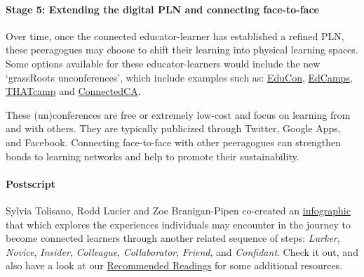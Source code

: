 \paragraph{Stage 5: Extending the digital PLN and connecting
face-to-face}

Over time, once the connected educator-learner has established a refined
PLN, these peeragogues may choose to shift their learning into physical
learning spaces. Some options available for these educator-learners
would include the new `grassRoots unconferences', which include examples
such as: \href{http://educonphilly.org/}{EduCon},
\href{http://davidwees.com/content/what-edcamp}{EdCamps},
\href{http://thatcamp.org/}{THATcamp} and
\href{http://connectedcanada.org/}{ConnectedCA}. 

These (un)conferences are free or extremely low-cost and focus on learning
from and with others.  They are typically publicized
through Twitter, Google Apps, and Facebook. Connecting face-to-face
with other peeragogues can strengthen bonds to learning networks and
help to promote their sustainability.

\paragraph{Postscript}

Sylvia Tolisano, Rodd Lucier and Zoe Branigan-Pipen co-created an
\href{http://farm9.staticflickr.com/8160/7161689001\_9b6725a4ca\_h.jpg}{infographic}
that which explores the experiences individuals may encounter in the
journey to become connected learners through another related sequence of
steps: \emph{Lurker}, \emph{Novice}, \emph{Insider}, \emph{Colleague},
\emph{Collaborator}, \emph{Friend}, and \emph{Confidant}. Check it out,
and also have a look at our
\href{http://peeragogy.org/recommended-reading/}{Recommended Readings}
for some additional resources.

